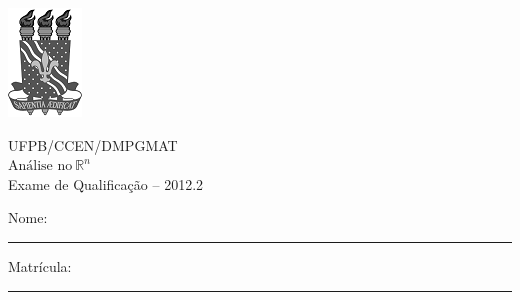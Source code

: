 \documentclass[11pt]{report}
\begin{document}
	\thispagestyle{empty}

	\noindent
	\begin{minipage}[c]{0.2\linewidth}
		\includegraphics{sm-ufpb-logo.png}
	\end{minipage} %
	\begin{minipage}[c]{0.7\linewidth}
		\begin{center}
			UFPB/CCEN/DMPGMAT \\
			$\mbox{Análise no} \ \mathbb{R}^{n}$ \\
			Exame de Qualificação -- 2012.2
		\end{center}
	\end{minipage}

	\vspace{0.8cm}
	
	Nome:\rule{10cm}{0.1mm}
	Matrícula:\rule{3cm}{0.1mm}
	\vspace{1cm}
	
\end{document}
